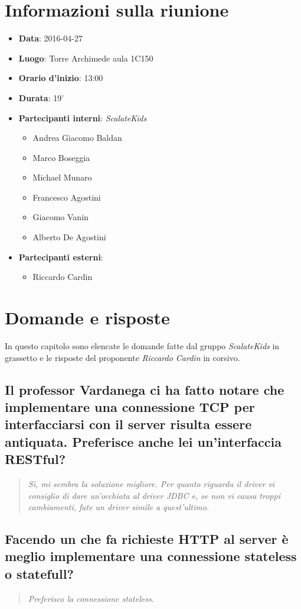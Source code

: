 \documentclass{scalatekids-article}
\begin{document}
\section{Informazioni sulla riunione}
\begin{itemize}
\item \textbf{Data}: 2016-04-27
\item \textbf{Luogo}: Torre Archimede aula 1C150
\item \textbf{Orario d'inizio}: 13:00
\item \textbf{Durata}: 19'
\item \textbf{Partecipanti interni}: \textit{ScalateKids}
  \begin{itemize}
  \item Andrea Giacomo Baldan 
  \item Marco Boseggia
  \item Michael Munaro
  \item Francesco Agostini
  \item Giacomo Vanin
  \item Alberto De Agostini
  \end{itemize}
\item \textbf{Partecipanti esterni}:
  \begin{itemize}
  \item Riccardo Cardin
  \end{itemize}
\end{itemize}
\section{Domande e risposte}
In questo capitolo sono elencate le domande fatte dal gruppo \textit{ScalateKids} in grassetto e le risposte del proponente \textit{Riccardo Cardin} in corsivo.
\subsection{Il professor Vardanega ci ha fatto notare che implementare una connessione TCP per interfacciarsi con il server risulta essere antiquata. Preferisce anche lei
un'interfaccia RESTful?}
\begin{quote}
  \textit{Sì, mi sembra la soluzione migliore. Per quanto riguarda il driver vi consiglio di dare un'occhiata al driver JDBC e, se non vi causa troppi cambiamenti, fate un driver simile a quest'ultimo.\\}
\end{quote}
\subsection{Facendo un  che fa richieste HTTP al server è meglio implementare una connessione stateless o statefull?}
\begin{quote}
  \textit{Preferisco la connessione stateless.\\}
\end{quote}
\end{document}
